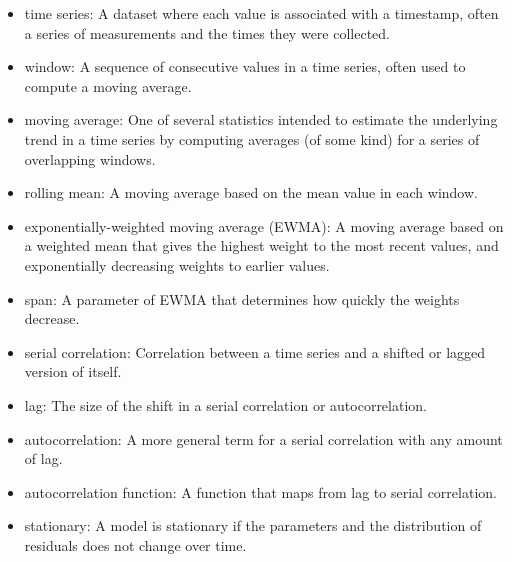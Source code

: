 \documentclass[12pt]{book}
\theoremstyle{exercise}
\begin{document}
\begin{itemize}

\item time series: A dataset where each value is associated with
a timestamp, often a series of measurements and the times they
were collected.%

\item window: A sequence of consecutive values in a time series,
often used to compute a moving average.%

\item moving average: One of several statistics intended to estimate
the underlying trend in a time series by computing averages (of
some kind) for a series of overlapping windows.%

\item rolling mean: A moving average based on the mean value in
each window.%

\item exponentially-weighted moving average (EWMA): A moving
average based on a weighted mean that gives the highest weight
to the most recent values, and exponentially decreasing weights
to earlier values.%
%

\item span: A parameter of EWMA that determines how quickly the
weights decrease.%

\item serial correlation: Correlation between a time series and
a shifted or lagged version of itself.%

\item lag: The size of the shift in a serial correlation or
autocorrelation.%

\item autocorrelation: A more general term for a serial correlation
with any amount of lag.%

\item autocorrelation function: A function that maps from lag to
serial correlation.

\item stationary: A model is stationary if the parameters and the
distribution of residuals does not change over time.%
%

\end{itemize}
\end{document}
